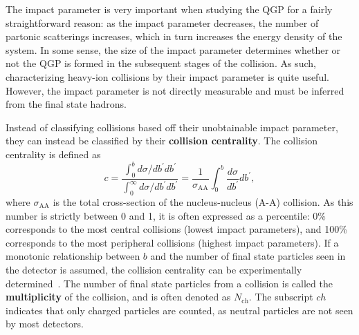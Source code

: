 The impact parameter is very important when studying the QGP for a fairly straightforward reason: as the impact parameter decreases, the number of partonic scatterings increases, which in turn increases the energy density of the system. In some sense, the size of the impact parameter determines whether or not the QGP is formed in the subsequent stages of the collision. As such, characterizing heavy-ion collisions by their impact parameter is quite useful.  However, the impact parameter is not directly measurable and must be inferred from the final state hadrons.

Instead of classifying collisions based off their unobtainable impact parameter, they can instead be classified by their \textbf{collision centrality}. The collision centrality is defined as
%
\begin{equation}
    \label{eq:centrality}
    c=\frac{\int_0^b d \sigma / d b^{\prime} d b^{\prime}}{\int_0^{\infty} d \sigma / d b^{\prime} d b^{\prime}}=\frac{1}{\sigma_{\mathrm{AA}}} \int_0^b \frac{d \sigma}{d b^{\prime}} d b^{\prime},
\end{equation}
%
where $\sigma_{\mathrm{AA}}$ is the total cross-section of the nucleus-nucleus (A-A) collision. As this number is strictly between 0 and 1, it is often expressed as a percentile: 0\% corresponds to the most central collisions (lowest impact parameters), and 100\% corresponds to the most peripheral collisions (highest impact parameters). If a monotonic relationship between $b$ and the number of final state particles seen in the detector is assumed, the collision centrality can be experimentally determined~\cite{GlauberModelALICE1}. The number of final state particles from a collision is called the \textbf{multiplicity} of the collision, and is often denoted as $N_\text{ch}$. The subscript $ch$ indicates that only charged particles are counted, as neutral particles are not seen by most detectors. 

